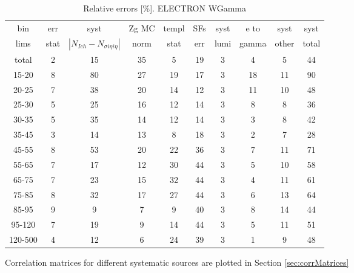 \begin{table}[h]
  \scriptsize
  \begin{center}
  \caption{Relative errors [\%]. ELECTRON WGamma}
   \begin{tabular}{|c|c|c|c|c|c|c|c|c|c|}
    bin  & err & syst & Zg MC & templ & SFs & syst & e to & syst & syst\\
    lims  & stat & $|N_{Ich}-N_{\sigma{i\eta i\eta}}|$ & norm & stat & err & lumi & gamma & other & total\\ \hline
    total  & 2 & 15 & 35 & 5 & 19 & 3 & 4 & 5 & 44 \\ \hline
    15-20 & 8 & 80 & 27 & 19 & 17 & 3 & 18 & 11 & 90 \\ \hline
    20-25 & 7 & 38 & 20 & 14 & 12 & 3 & 11 & 10 & 48 \\ \hline
    25-30 & 5 & 25 & 16 & 12 & 14 & 3 & 8 & 8 & 36 \\ \hline
    30-35 & 5 & 35 & 14 & 12 & 14 & 3 & 3 & 8 & 42 \\ \hline
    35-45 & 3 & 14 & 13 & 8 & 18 & 3 & 2 & 7 & 28 \\ \hline
    45-55 & 8 & 53 & 20 & 22 & 36 & 3 & 7 & 11 & 71 \\ \hline
    55-65 & 7 & 17 & 12 & 30 & 44 & 3 & 5 & 10 & 58 \\ \hline
    65-75 & 7 & 23 & 15 & 32 & 44 & 3 & 4 & 11 & 61 \\ \hline
    75-85 & 8 & 32 & 17 & 27 & 44 & 3 & 6 & 13 & 64 \\ \hline
    85-95 & 9 & 9 & 7 & 9 & 40 & 3 & 8 & 14 & 44 \\ \hline
    95-120 & 7 & 19 & 9 & 14 & 44 & 3 & 5 & 11 & 51 \\ \hline
    120-500 & 4 & 12 & 6 & 24 & 39 & 3 & 1 & 9 & 48 \\ \hline
  \end{tabular}
  \label{tab:systInPercent_ELECTRON_WGamma}
  \end{center}
\end{table}


Correlation matrices for different systematic sources are plotted in Section \ref{sec:corrMatrices}

